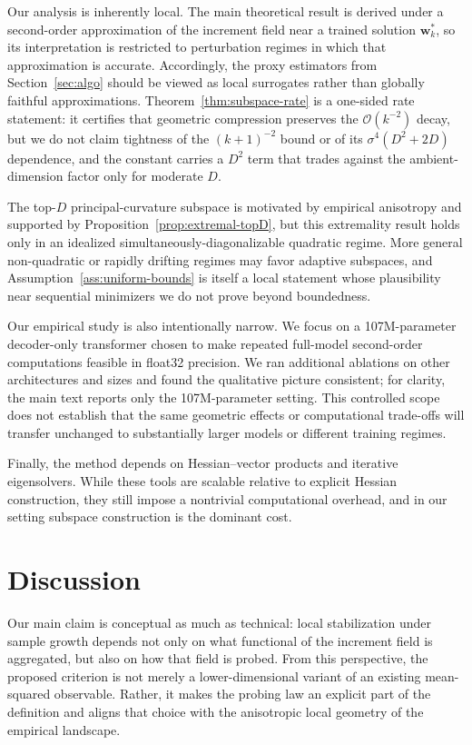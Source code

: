 \documentclass{article}
\begin{document}
Our analysis is inherently local. The main theoretical result is derived under a second-order approximation of the increment field near a trained solution $\mathbf w_k^*$, so its interpretation is restricted to perturbation regimes in which that approximation is accurate. Accordingly, the proxy estimators from Section~\ref{sec:algo} should be viewed as local surrogates rather than globally faithful approximations. Theorem~\ref{thm:subspace-rate} is a one-sided rate statement: it certifies that geometric compression preserves the $\mathcal O(k^{-2})$ decay, but we do not claim tightness of the $(k+1)^{-2}$ bound or of its $\sigma^4(D^2+2D)$ dependence, and the constant carries a $D^2$ term that trades against the ambient-dimension factor only for moderate $D$.

The top-$D$ principal-curvature subspace is motivated by empirical anisotropy and supported by Proposition~\ref{prop:extremal-topD}, but this extremality result holds only in an idealized simultaneously-diagonalizable quadratic regime. More general non-quadratic or rapidly drifting regimes may favor adaptive subspaces, and Assumption~\ref{ass:uniform-bounds} is itself a local statement whose plausibility near sequential minimizers we do not prove beyond boundedness.

Our empirical study is also intentionally narrow. We focus on a 107M-parameter decoder-only transformer chosen to make repeated full-model second-order computations feasible in float32 precision. We ran additional ablations on other architectures and sizes and found the qualitative picture consistent; for clarity, the main text reports only the 107M-parameter setting. This controlled scope does not establish that the same geometric effects or computational trade-offs will transfer unchanged to substantially larger models or different training regimes.

Finally, the method depends on Hessian--vector products and iterative eigensolvers. While these tools are scalable relative to explicit Hessian construction, they still impose a nontrivial computational overhead, and in our setting subspace construction is the dominant cost.

\section{Discussion}
\label{sec:discussion}

Our main claim is conceptual as much as technical: local stabilization under sample growth depends not only on what functional of the increment field is aggregated, but also on how that field is probed. From this perspective, the proposed criterion is not merely a lower-dimensional variant of an existing mean-squared observable. Rather, it makes the probing law an explicit part of the definition and aligns that choice with the anisotropic local geometry of the empirical landscape.
\end{document}

